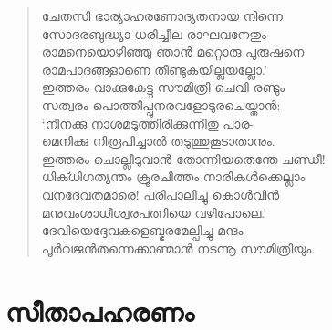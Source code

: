 \begin{verse}
ചേതസി ഭാര്യാഹരണോദ്യതനായ നിന്നെ\\
സോദരബുദ്ധ്യാ ധരിച്ചീല രാഘവനേതും\\
രാമനെയൊഴിഞ്ഞു ഞാന്‍ മറ്റൊരു പുരുഷനെ\\
രാമപാദങ്ങളാണെ തീണ്ടുകയില്ലയല്ലോ.’\\
ഇത്തരം വാക്കുകേട്ടു സൗമിത്രി ചെവി രണ്ടും\\
സത്വരം പൊത്തിപ്പുനരവളോടുരചെയ്താന്‍:\\
‘നിനക്കു നാശമടുത്തിരിക്കുന്നിതു പാര-\\
മെനിക്കു നിരൂപിച്ചാല്‍ തടുത്തുകൂടാതാനും.\\
ഇത്തരം ചൊല്ലീടുവാന്‍ തോന്നിയതെന്തേ ചണ്ഡീ!\\
ധിക്ധിഗത്യന്തം ക്രൂരചിത്തം നാരികള്‍ക്കെല്ലാം\\
വനദേവതമാരെ! പരിപാലിച്ചു കൊള്‍വിന്‍\\
മനുവംശാധീശ്വരപത്നിയെ വഴിപോലെ.’\\
ദേവിയെദ്ദേവകളെബ്ഭരമേല്പിച്ചു മന്ദം\\
പൂര്‍വജന്‍തന്നെക്കാണ്മാന്‍ നടന്നൂ സൗമിത്രിയും.
\end{verse}

\section{സീതാപഹരണം}

